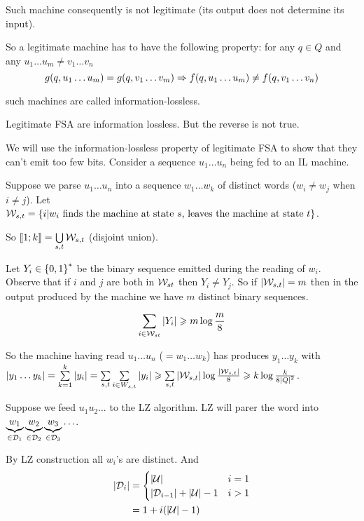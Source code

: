Such machine consequently is not legitimate (its output does not determine its input).

\begin{corollary}
    So a legitimate machine has to have the following property: for any $q\in Q$ and any $u_1\ldots u_m \neq v_1\ldots v_n$
    \[
            g(q,u_1\ldots u_m) = g(q,v_1\ldots v_m) \Rightarrow f(q,u_1\ldots u_m) \neq f(q,v_1\ldots v_n)
    \]
\end{corollary}
such machines are called information-lossless.

Legitimate FSA are information lossless. But the reverse is not true.

We will use the information-lossless property of legitimate FSA to show that they can't emit too few bits. Consider a sequence $u_1\ldots u_n$ being fed to an IL machine.

Suppose we parse $u_1\ldots u_n$ into a sequence $w_1 \ldots w_k$ of distinct words ($w_i \neq w_j$ when $i\neq j$). Let $\mathcal{W}_{s,t} = \left\{ i \vert w_i \text{ finds the machine at state }s\text{, leaves the machine at state }t \right\}$.

So $\left\llbracket 1;k \right\rrbracket = \bigcup\limits_{s,t} \mathcal{W}_{s,t}$ (disjoint union).

Let $Y_i \in \left\{ 0,1 \right\}^*$ be the binary sequence emitted during the reading of $w_i$. Observe that if $i$ and $j$ are both in $\mathcal{W}_{st}$ then $Y_i \neq Y_j$. So if $\lvert \mathcal{W}_{s,t}\rvert = m$ then in the output produced by the machine we have $m$ distinct binary sequences.

\[
    \sum\limits_{i \in \mathcal{W}_{st}} \left\lvert Y_i\right\rvert \geqslant m\log\frac{m}{8}
\]


So the machine having read $u_1\ldots u_n$ ($=w_1\ldots w_k$) has produces $y_1\ldots y_k$ with $\left\lvert y_1\ldots y_k\right\rvert = \sum\limits_{k=1}^k \left\lvert y_i\right\rvert = \sum\limits_{s,t}\sum\limits_{i\in W_{s,t}} \left\lvert y_i\right\rvert \geqslant \sum\limits_{s,t} \left\lvert\mathcal{W}_{s,t}\right\rvert \log\frac{\left\lvert\mathcal{W}_{s,t}\right\rvert}{8}\geqslant k\log\frac{k}{8\left\lvert Q\right\rvert^2}$.


Suppose we feed $u_1u_2\ldots$ to the LZ algorithm. LZ will parer the word into $\underbrace{w_1}_{\in \mathcal{D}_1} \underbrace{w_2}_{\in \mathcal{D}_2} \underbrace{w_3}_{\in \mathcal{D}_3} \ldots$.

By LZ construction all $w_i$'s are distinct. And 
\[
    \begin{aligned}
        \left\lvert\mathcal{D}_i\right\rvert &= \begin{cases} \left\lvert\mathcal{U}\right\rvert & i=1 \\ \left\lvert\mathcal{D}_{i-1}\right\rvert + \left\lvert\mathcal{U}\right\rvert - 1 & i > 1\end{cases}\\
        &= 1+i(\left\lvert\mathcal{U}\right\rvert -1 )
    \end{aligned}
\]

